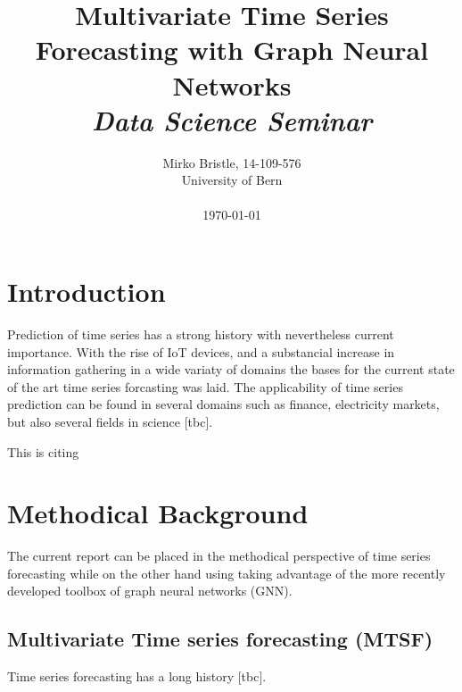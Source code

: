 \documentclass[letterpaper,twocolumn,11pt]{article}
\begin{document}
\title{\Large \bf Multivariate Time Series Forecasting with Graph Neural Networks \\
 \Medium \it Data Science Seminar
}

\author{
{\rm Mirko Bristle, 14-109-576}\\
    University of Bern \\
    \\
    \today
}
\maketitle


%

\section{Introduction}

Prediction of time series has a strong history with nevertheless current importance. With the rise of IoT devices, and a substancial
increase in information gathering in a wide variaty of domains the bases for the current state of the art time series forcasting was laid.
The applicability of time series prediction can be found in several domains such as finance, electricity markets, but also several fields in science [tbc].



This is citing \cite{wu2020connecting}


\section{Methodical Background}
The current report can be placed in the methodical perspective of time series forecasting while on the other hand using
taking advantage of the more recently developed toolbox of graph neural networks (GNN).
\subsection{Multivariate Time series forecasting (MTSF)}
Time series forecasting has a long history [tbc].
\end{document}
